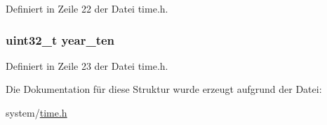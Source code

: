 Definiert in Zeile 22 der Datei time.\+h.

\hypertarget{structtime__date_a124f7250b4c2e15669a832132940840d}{}
\subsubsection[{year\+\_\+ten}]{\setlength{\rightskip}{0pt plus 5cm}uint32\+\_\+t year\+\_\+ten}\label{structtime__date_a124f7250b4c2e15669a832132940840d}


Definiert in Zeile 23 der Datei time.\+h.



Die Dokumentation für diese Struktur wurde erzeugt aufgrund der Datei\+:\begin{DoxyCompactItemize}
\item 
system/\hyperlink{time_8h}{time.\+h}\end{DoxyCompactItemize}
